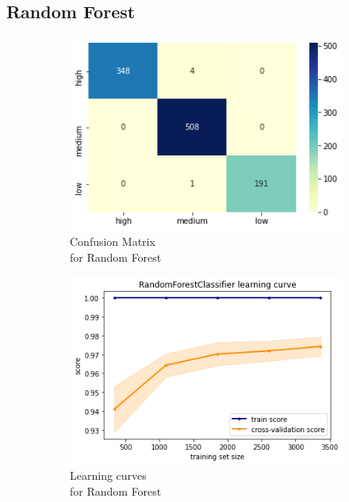 \subsection{Random Forest}
\begin{figure}[h!]
     \captionsetup{justification=centering}             
     \centering
     \begin{subfigure}{0.49\textwidth}
         \centering
         \captionsetup{type=figure}
         \includegraphics[width=\textwidth]{img/classification/rf_confusion.png}
         \caption{Confusion Matrix \\ for Random Forest}
         \label{fig:rf_confusion}
     \end{subfigure}
     \begin{subfigure}{0.49\textwidth}
         \centering
         \includegraphics[width=\textwidth]{img/classification/rf_lc.png}
         \caption{Learning curves \\ for Random Forest}
         \label{fig:rf_lc}
     \end{subfigure}
     \caption{}
    \label{fig:rf}
\end{figure}

